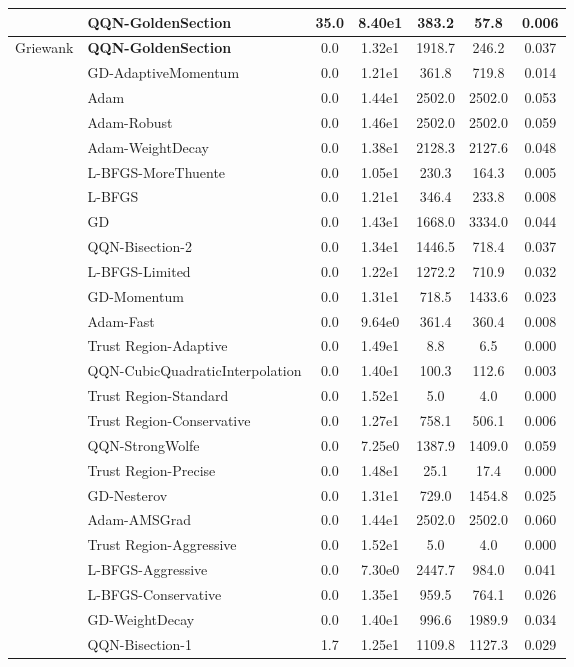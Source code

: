\documentclass{article}
\begin{document}
\begin{table}[htbp]
{\begin{tabular}{p{2.5cm}p{2.5cm}*{5}{c}}
 & QQN-GoldenSection & 35.0 & 8.40e1 & 383.2 & 57.8 & 0.006 \\
\midrule
\multirow{25}{*}{Griewank} & \textbf{QQN-GoldenSection} & 0.0 & 1.32e1 & 1918.7 & 246.2 & 0.037 \\
 & GD-AdaptiveMomentum & 0.0 & 1.21e1 & 361.8 & 719.8 & 0.014 \\
 & Adam & 0.0 & 1.44e1 & 2502.0 & 2502.0 & 0.053 \\
 & Adam-Robust & 0.0 & 1.46e1 & 2502.0 & 2502.0 & 0.059 \\
 & Adam-WeightDecay & 0.0 & 1.38e1 & 2128.3 & 2127.6 & 0.048 \\
 & L-BFGS-MoreThuente & 0.0 & 1.05e1 & 230.3 & 164.3 & 0.005 \\
 & L-BFGS & 0.0 & 1.21e1 & 346.4 & 233.8 & 0.008 \\
 & GD & 0.0 & 1.43e1 & 1668.0 & 3334.0 & 0.044 \\
 & QQN-Bisection-2 & 0.0 & 1.34e1 & 1446.5 & 718.4 & 0.037 \\
 & L-BFGS-Limited & 0.0 & 1.22e1 & 1272.2 & 710.9 & 0.032 \\
 & GD-Momentum & 0.0 & 1.31e1 & 718.5 & 1433.6 & 0.023 \\
 & Adam-Fast & 0.0 & 9.64e0 & 361.4 & 360.4 & 0.008 \\
 & Trust Region-Adaptive & 0.0 & 1.49e1 & 8.8 & 6.5 & 0.000 \\
 & QQN-CubicQuadraticInterpolation & 0.0 & 1.40e1 & 100.3 & 112.6 & 0.003 \\
 & Trust Region-Standard & 0.0 & 1.52e1 & 5.0 & 4.0 & 0.000 \\
 & Trust Region-Conservative & 0.0 & 1.27e1 & 758.1 & 506.1 & 0.006 \\
 & QQN-StrongWolfe & 0.0 & 7.25e0 & 1387.9 & 1409.0 & 0.059 \\
 & Trust Region-Precise & 0.0 & 1.48e1 & 25.1 & 17.4 & 0.000 \\
 & GD-Nesterov & 0.0 & 1.31e1 & 729.0 & 1454.8 & 0.025 \\
 & Adam-AMSGrad & 0.0 & 1.44e1 & 2502.0 & 2502.0 & 0.060 \\
 & Trust Region-Aggressive & 0.0 & 1.52e1 & 5.0 & 4.0 & 0.000 \\
 & L-BFGS-Aggressive & 0.0 & 7.30e0 & 2447.7 & 984.0 & 0.041 \\
 & L-BFGS-Conservative & 0.0 & 1.35e1 & 959.5 & 764.1 & 0.026 \\
 & GD-WeightDecay & 0.0 & 1.40e1 & 996.6 & 1989.9 & 0.034 \\
 & QQN-Bisection-1 & 1.7 & 1.25e1 & 1109.8 & 1127.3 & 0.029 \\

\end{tabular}}
\end{table}
\end{document}
